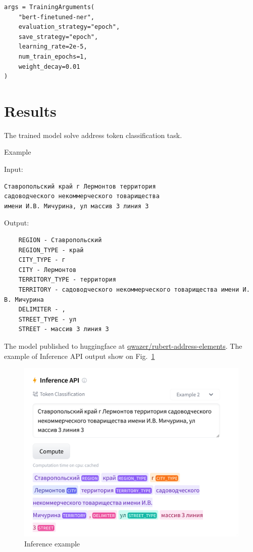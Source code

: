 \documentclass{article}
\begin{document}
\begin{verbatim}
args = TrainingArguments(
    "bert-finetuned-ner",
    evaluation_strategy="epoch",
    save_strategy="epoch",
    learning_rate=2e-5,
    num_train_epochs=1,
    weight_decay=0.01
)
\end{verbatim}


\section{Results}

The trained model solve address token classification task.

Example

Input:
\begin{verbatim}
Ставропольский край г Лермонтов территория
садоводческого некоммерческого товарищества
имени И.В. Мичурина, ул массив 3 линия 3
\end{verbatim}
Output:
\begin{verbatim}
    REGION - Ставропольский
    REGION_TYPE - край
    CITY_TYPE - г
    CITY - Лермонтов
    TERRITORY_TYPE - территория
    TERRITORY - садоводческого некоммерческого товарищества имени И. В. Мичурина
    DELIMITER - ,
    STREET_TYPE - ул
    STREET - массив 3 линия 3
\end{verbatim}

The model published to huggingface at \href{https://huggingface.co/qwazer/rubert-address-elements}{qwazer/rubert-address-elements}.
The example of Inference API output show on Fig.~\ref{fig:inference-example}

\begin{figure}[!tbh]
    \centering
    \includegraphics[width=1\linewidth]{inference-example-02}
    \caption{Inference example}
    \label{fig:inference-example}
\end{figure}
\end{document}
